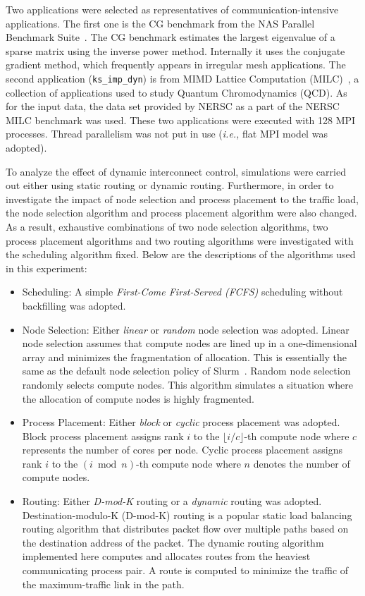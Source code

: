 Two applications were selected as representatives of
communication-intensive applications. The first one is the CG benchmark
from the NAS Parallel Benchmark Suite~\autocite{Bailey1991}. The CG
benchmark estimates the largest eigenvalue of a sparse matrix using the
inverse power method. Internally it uses the conjugate gradient method,
which frequently appears in irregular mesh applications. The second
application (\lstinline!ks_imp_dyn!) is from MIMD
Lattice Computation (MILC)~\autocite{milc}, a collection of applications used
to study Quantum Chromodynamics (QCD). As for the input data, the data set
provided by NERSC as a part of the NERSC MILC benchmark was used. These two
applications were executed with 128 MPI processes. Thread parallelism was not
put in use (\emph{i.e.,} flat MPI model was adopted).

To analyze the effect of dynamic interconnect control, simulations were
carried out either using static routing or dynamic routing. Furthermore,
in order to investigate the impact of node selection and process
placement to the traffic load, the node selection algorithm and process
placement algorithm were also changed. As a result, exhaustive
combinations of two node selection algorithms, two process placement
algorithms and two routing algorithms were investigated with the
scheduling algorithm fixed. Below are the descriptions of the algorithms
used in this experiment:

\begin{itemize}
\item
  Scheduling: A simple \emph{First-Come First-Served (FCFS)} scheduling
  without backfilling was adopted.
\item
  Node Selection: Either \emph{linear} or \emph{random} node selection
  was adopted. Linear node selection assumes that compute nodes are
  lined up in a one-dimensional array and minimizes the fragmentation of
  allocation. This is essentially the same as the default node selection
  policy of Slurm~\autocite{Yoo2003}. Random node selection randomly selects
  compute nodes. This algorithm simulates a situation where the allocation of
  compute nodes is highly fragmented.
\item
  Process Placement: Either \emph{block} or \emph{cyclic} process
  placement was adopted. Block process placement assigns rank \(i\) to
  the \(\lfloor i / c \rfloor\)-th compute node where \(c\) represents
  the number of cores per node. Cyclic process placement assigns rank
  \(i\) to the \((i \bmod n)\)-th compute node where \(n\) denotes the
  number of compute nodes.
\item
  Routing: Either \emph{D-mod-K} routing or a \emph{dynamic} routing was
  adopted. Destination-modulo-K (\mbox{D-mod-K}) routing is a
  popular static load balancing routing algorithm that distributes
  packet flow over multiple paths based on the destination address of
  the packet. The dynamic routing algorithm implemented here computes
  and allocates routes from the heaviest communicating process pair. A
  route is computed to minimize the traffic of the maximum-traffic link
  in the path.
\end{itemize}

